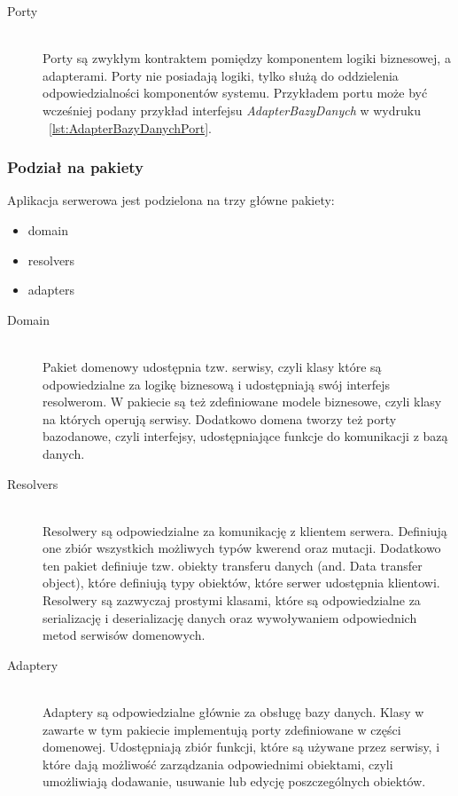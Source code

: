 \begin{description}
\vspace{0.4cm}

\item[Porty] \hfill \\ Porty są zwykłym kontraktem pomiędzy komponentem logiki biznesowej, a adapterami. Porty nie posiadają logiki, tylko służą do oddzielenia odpowiedzialności komponentów systemu. Przykładem portu może być wcześniej podany przykład interfejsu \emph{AdapterBazyDanych} w wydruku ~\ref{lst:AdapterBazyDanychPort}.

\end{description}

\subsubsection{Podział na pakiety}
Aplikacja serwerowa jest podzielona na trzy główne pakiety:
\begin{itemize}
  \item domain
  \item resolvers
  \item adapters
\end{itemize}
\begin{description}

  \item[Domain] \hfill \\ Pakiet domenowy udostępnia tzw. serwisy, czyli klasy które są odpowiedzialne za logikę biznesową i udostępniają swój interfejs resolwerom. W pakiecie są też zdefiniowane modele biznesowe, czyli klasy na których operują serwisy. Dodatkowo domena tworzy też porty bazodanowe, czyli interfejsy, udostępniające funkcje do komunikacji z bazą danych.
  \item[Resolvers] \hfill \\ Resolwery są odpowiedzialne za komunikację z klientem serwera. Definiują one zbiór wszystkich możliwych typów kwerend oraz mutacji. Dodatkowo ten pakiet definiuje tzw. obiekty transferu danych (and. Data transfer object), które definiują typy obiektów, które serwer udostępnia klientowi. Resolwery są zazwyczaj prostymi klasami, które są odpowiedzialne za serializację i deserializację danych oraz wywoływaniem odpowiednich metod serwisów domenowych.
  \item[Adaptery] \hfill \\ Adaptery są odpowiedzialne głównie za obsługę bazy danych. Klasy w zawarte w tym pakiecie implementują porty zdefiniowane w części domenowej. Udostępniają zbiór funkcji, które są używane przez serwisy, i które dają możliwość zarządzania odpowiednimi obiektami, czyli umożliwiają dodawanie, usuwanie lub edycję poszczególnych obiektów.

\end{description}
